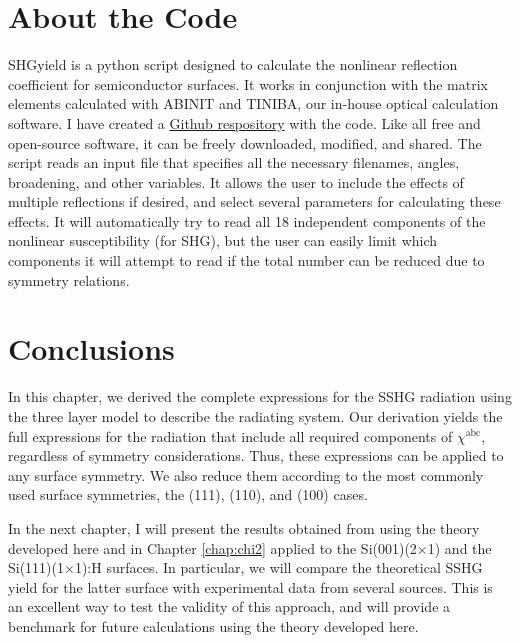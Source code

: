 
\section{About the Code}

SHGyield is a python script designed to calculate the nonlinear reflection
coefficient for semiconductor surfaces. It works in conjunction with the matrix
elements calculated with ABINIT and TINIBA, our in-house optical calculation
software. I have created a 
\href{https://github.com/roguephysicist/SHGYield}{Github respository}
with the code. Like all free and open-source software, it can be freely
downloaded, modified, and shared. The script reads an input file that specifies
all the necessary filenames, angles, broadening, and other variables. It allows
the user to include the effects of multiple reflections if desired, and select
several parameters for calculating these effects. It will automatically try to
read all 18 independent components of the nonlinear susceptibility (for SHG),
but the user can easily limit which components it will attempt to read if the
total number can be reduced due to symmetry relations.


\section{Conclusions}

In this chapter, we derived the complete expressions for the SSHG radiation
using the three layer model to describe the radiating system. Our derivation
yields the full expressions for the radiation that include all required
components of $\chi^{\mathrm{abc}}$, regardless of symmetry considerations.
Thus, these expressions can be applied to any surface symmetry. We also reduce
them according to the most commonly used surface symmetries, the (111), (110),
and (100) cases.

In the next chapter, I will present the results obtained from using the theory
developed here and in Chapter \ref{chap:chi2} applied to the Si(001)(2$\times$1)
and the Si(111)(1$\times$1):H surfaces. In particular, we will compare the
theoretical SSHG yield for the latter surface with experimental data from
several sources. This is an excellent way to test the validity of this approach,
and will provide a benchmark for future calculations using the theory developed
here.

\stopcontents[chapters]
